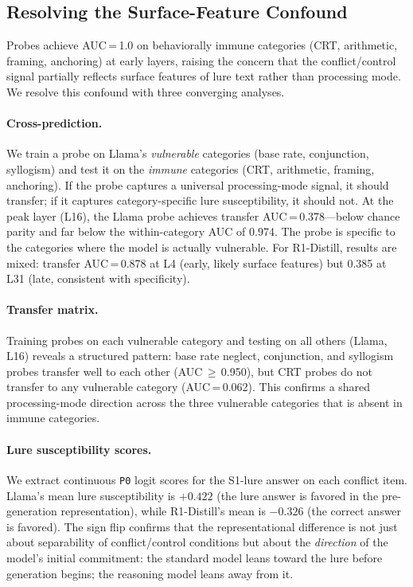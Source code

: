 \documentclass[twocolumn,10pt]{article}
\newcommand{\pzero}{\texttt{P0}}
\begin{document}
\subsection{Resolving the Surface-Feature Confound}
\label{sec:specificity}

Probes achieve AUC\,=\,1.0 on behaviorally immune categories (CRT,
arithmetic, framing, anchoring) at early layers, raising the concern
that the conflict/control signal partially reflects surface features of
lure text rather than processing mode.  We resolve this confound with
three converging analyses.

\paragraph{Cross-prediction.}
We train a probe on Llama's \emph{vulnerable} categories (base rate,
conjunction, syllogism) and test it on the \emph{immune} categories
(CRT, arithmetic, framing, anchoring).  If the probe captures a
universal processing-mode signal, it should transfer; if it captures
category-specific lure susceptibility, it should not.  At the peak layer
(L16), the Llama probe achieves transfer AUC\,=\,0.378---below chance
parity and far below the within-category AUC of 0.974.  The probe is
specific to the categories where the model is actually vulnerable.  For
R1-Distill, results are mixed: transfer AUC\,=\,0.878 at L4 (early,
likely surface features) but 0.385 at L31 (late, consistent with
specificity).

\paragraph{Transfer matrix.}
Training probes on each vulnerable category and testing on all others
(Llama, L16) reveals a structured pattern: base rate neglect,
conjunction, and syllogism probes transfer well to each other
(AUC\,$\geq$\,0.950), but CRT probes do not transfer to any vulnerable
category (AUC\,=\,0.062).  This confirms a shared processing-mode
direction across the three vulnerable categories that is absent in
immune categories.

\paragraph{Lure susceptibility scores.}
We extract continuous \pzero{} logit scores for the S1-lure answer on
each conflict item.  Llama's mean lure susceptibility is $+0.422$
(the lure answer is favored in the pre-generation representation),
while R1-Distill's mean is $-0.326$ (the correct answer is favored).
The sign flip confirms that the representational difference is not just
about separability of conflict/control conditions but about the
\emph{direction} of the model's initial commitment: the standard model
leans toward the lure before generation begins; the reasoning model leans
away from it.
\end{document}
